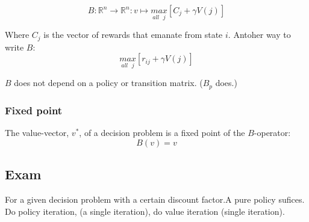 \documentclass{article}
\begin{document}
\[B: \mathbb{R}^n \to \mathbb{R}^n : v \mapsto
	\underset{all\mbox{\ }j}{max}[C_j + \gamma V(j)] \]

Where $C_j$ is the vector of rewards that emanate from state $i$.
Antoher way to write $B:$
\[\underset{all\mbox{\ }j}{max}[r_{ij} + \gamma V(j)] \]

$B$ does not depend on a policy or transition matrix. ($B_p$ does.)

\subsubsection{Fixed point}
The value-vector, $v^*$, of a decision problem is a fixed point of the
$B$-operator:
\[ B(v) = v\]


\subsection{Exam}
 For a given decision problem with a certain
discount factor.A pure policy sufices.
Do policy iteration, (a single iteration), do value iteration
(single iteration).

\end{document}
